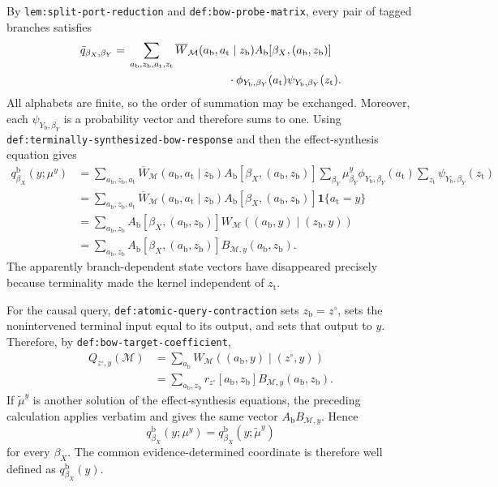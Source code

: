 By \texttt{lem:split-port-reduction} and \texttt{def:bow-probe-matrix}, every pair of tagged branches satisfies
\[
\begin{aligned}
 \bar q_{\beta_X,\beta_Y}
 ={}&\sum_{a_{\mathrm b},z_{\mathrm b},a_{\mathrm t},z_{\mathrm t}}
 \overline W_{\mathcal M}(a_{\mathrm b},a_{\mathrm t}\mid z_{\mathrm b})
 A_{\mathrm b}[\beta_X,(a_{\mathrm b},z_{\mathrm b})]\\
 &\hspace{31mm}\cdot
 \phi_{Y_{\mathrm b},\beta_Y}(a_{\mathrm t})
 \psi_{Y_{\mathrm b},\beta_Y}(z_{\mathrm t}).
\end{aligned}
\]
All alphabets are finite, so the order of summation may be exchanged.  Moreover, each \(\psi_{Y_{\mathrm b},\beta_Y}\) is a probability vector and therefore sums to one.  Using \texttt{def:terminally-synthesized-bow-response} and then the effect-synthesis equation gives
\[
\begin{aligned}
 q^{\mathrm b}_{\beta_X}(y;\mu^y)
 & =\sum_{a_{\mathrm b},z_{\mathrm b},a_{\mathrm t}}
 \overline W_{\mathcal M}(a_{\mathrm b},a_{\mathrm t}\mid z_{\mathrm b})
 A_{\mathrm b}[\beta_X,(a_{\mathrm b},z_{\mathrm b})]
 \sum_{\beta_Y}\mu^y_{\beta_Y}
 \phi_{Y_{\mathrm b},\beta_Y}(a_{\mathrm t})
 \sum_{z_{\mathrm t}}\psi_{Y_{\mathrm b},\beta_Y}(z_{\mathrm t})\\
 & =\sum_{a_{\mathrm b},z_{\mathrm b},a_{\mathrm t}}
 \overline W_{\mathcal M}(a_{\mathrm b},a_{\mathrm t}\mid z_{\mathrm b})
 A_{\mathrm b}[\beta_X,(a_{\mathrm b},z_{\mathrm b})]
 \mathbf 1\{a_{\mathrm t}=y\}\\
 & =\sum_{a_{\mathrm b},z_{\mathrm b}}
 A_{\mathrm b}[\beta_X,(a_{\mathrm b},z_{\mathrm b})]
 W_{\mathcal M}((a_{\mathrm b},y)\mid(z_{\mathrm b},y))\\
 & =\sum_{a_{\mathrm b},z_{\mathrm b}}
 A_{\mathrm b}[\beta_X,(a_{\mathrm b},z_{\mathrm b})]
 B_{\mathcal M,y}(a_{\mathrm b},z_{\mathrm b}).
\end{aligned}
\]
The apparently branch-dependent state vectors have disappeared precisely because terminality made the kernel independent of \(z_{\mathrm t}\).

For the causal query, \texttt{def:atomic-query-contraction} sets \(z_{\mathrm b}=z^{\circ}\), sets the nonintervened terminal input equal to its output, and sets that output to \(y\).  Therefore, by \texttt{def:bow-target-coefficient},
\[
\begin{aligned}
 Q_{z^{\circ},y}(\mathcal M)
 &=\sum_{a_{\mathrm b}}
 W_{\mathcal M}((a_{\mathrm b},y)\mid(z^{\circ},y))\\
 &=\sum_{a_{\mathrm b},z_{\mathrm b}}
 r_{z^{\circ}}[a_{\mathrm b},z_{\mathrm b}]
 B_{\mathcal M,y}(a_{\mathrm b},z_{\mathrm b}).
\end{aligned}
\]
If \(\widetilde\mu^y\) is another solution of the effect-synthesis equations, the preceding calculation applies verbatim and gives the same vector \(A_{\mathrm b}B_{\mathcal M,y}\).  Hence
\[
 q^{\mathrm b}_{\beta_X}(y;\mu^y)
 =q^{\mathrm b}_{\beta_X}(y;\widetilde\mu^y)
\]
for every \(\beta_X\).  The common evidence-determined coordinate is therefore well defined as \(q^{\mathrm b}_{\beta_X}(y)\).